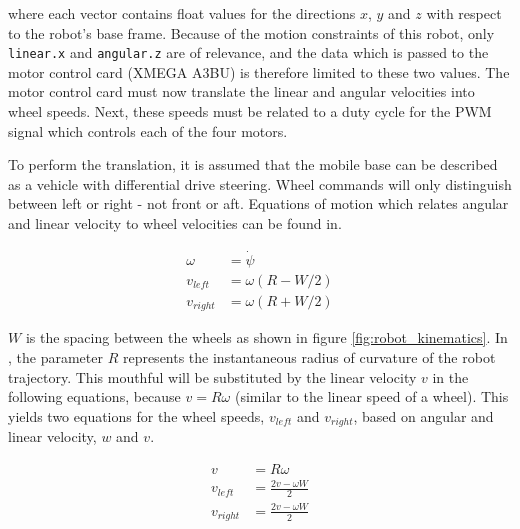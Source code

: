 where each vector contains float values for the directions $x$, $y$ and $z$ with respect to the robot's base frame. Because of the motion constraints of this robot, only \texttt{linear.x} and \texttt{angular.z} are of relevance, and the data which is passed to the motor control card (XMEGA A3BU) is therefore limited to these two values. The motor control card must now translate the linear and angular velocities into wheel speeds. Next, these speeds must be related to a duty cycle for the \ac{PWM} signal which controls each of the four motors.

To perform the translation, it is assumed that the mobile base can be described as a vehicle with differential drive steering. Wheel commands will only distinguish between left or right - not front or aft. Equations of motion which relates angular and linear velocity to wheel velocities can be found in\cite{cook2011mobile}. 

\begin{subequations}\label{eq:subeqns}
  	\begin{align}
	  	\omega &= \dot{\psi} \\
	   	v_{left} &= \omega (R - W/2)\\
	   	v_{right} &= \omega (R + W/2) \label{eq:subeq2}
   	\end{align}
\end{subequations}

$W$ is the spacing between the wheels as shown in figure \ref{fig:robot_kinematics}. In \cite{cook2011mobile}, the parameter $R$ represents the instantaneous radius of curvature of the robot trajectory. This mouthful will be substituted by the linear velocity $v$ in the following equations, because $v = R\omega$ (similar to the linear speed of a wheel). This yields two equations for the wheel speeds, $v_{left}$ and $v_{right}$, based on angular and linear velocity, $w$ and $v$.

 \begin{subequations}%
 	\begin{align}
 	v &= R\omega \\
 	v_{left} &=  \frac{2v - \omega W}{2}\\
 	v_{right} &= \frac{2v - \omega W}{2} %
 	\end{align}
 \end{subequations}

